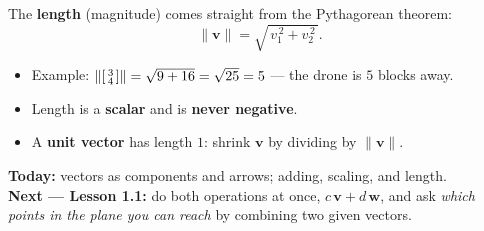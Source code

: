 \documentclass[aspectratio=169, 11pt]{beamer}
\newcommand{\vv}{\mathbf{v}}
\newcommand{\ww}{\mathbf{w}}
\begin{document}
\begin{frame}[t, plain]
  The \textbf{length} (magnitude) comes straight from the Pythagorean theorem:
  \[
    \|\vv\| = \sqrt{\,v_1^{\,2}+v_2^{\,2}\,}.
  \]
  \begin{itemize}
    \item Example: $\left\|\begin{bsmallmatrix} 3\\4 \end{bsmallmatrix}\right\|
          = \sqrt{9+16} = \sqrt{25} = 5$ --- the drone is $5$ blocks away.
    \item Length is a \textbf{scalar} and is \textbf{never negative}.
    \item A \textbf{unit vector} has length $1$: shrink $\vv$ by dividing by $\|\vv\|$.
  \end{itemize}
\end{frame}

\begin{frame}[t, plain]
  \textbf{Today:} vectors as components and arrows; adding, scaling, and length.\\[8pt]
  \textbf{Next --- Lesson 1.1:} do both operations at once, $c\,\vv + d\,\ww$, and ask
  \emph{which points in the plane you can reach} by combining two given vectors.
\end{frame}
\end{document}
